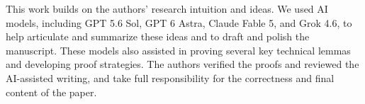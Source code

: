 \documentclass[11pt]{article}
\begin{document}
This work builds on the authors' research intuition and ideas. We used AI models, including GPT 5.6 Sol, GPT 6 Astra, Claude Fable 5, and Grok 4.6, to help articulate and summarize these ideas and to draft and polish the manuscript. These models also assisted in proving several key technical lemmas and developing proof strategies. The authors verified the proofs and reviewed the AI-assisted writing, and take full responsibility for the correctness and final content of the paper.






\end{document}
